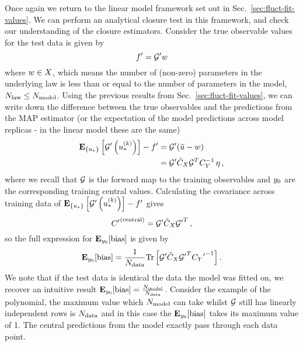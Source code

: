 Once again we return to the linear model framework set out in
Sec.~\ref{sec:fluct-fit-values}. We can perform an analytical closure test in
this framework, and check our understanding of the closure estimators. Consider
the true observable values for the test data is given by
\begin{equation}\label{eq:LinearLawMap}
    {{f}^{\prime}} = {{\mathcal{G}}^{\prime}} w
\end{equation}
where $w \in X$, which means the number of (non-zero)
parameters in the underlying law is less than or equal to the number of
parameters in the model, $N_{\rm law} \leq N_{\rm model}$. Using the previous results from
Sec.~\ref{sec:fluct-fit-values}, we can write down the difference between the
true observables and the predictions from the MAP estimator (or the expectation
of the model predictions across model replicas - in the linear model these are
the same)
\begin{equation}
    \begin{split}
        \mathbf{E}_{\{ u_* \}} \left[ {{\mathcal{G}}^{\prime}}\left(u_*^{(k)}\right) \right] - {{f}^{\prime}} &=
        {{\mathcal{G}}^{\prime}} (\tilde{u} - w ) \\
        &= {{\mathcal{G}}^{\prime}} \tilde{C}_X \mathcal{G}^T C_{Y}^{-1} \, \eta \, ,
    \end{split}
\end{equation}
where we recall that $\mathcal{G}$ is the forward map to the training observables
and $y_0$ are the corresponding training central values. Calculating
the covariance across training data of
$\mathbf{E}_{\{ u_* \}} \left[ {{\mathcal{G}}^{\prime}}\left(u_*^{(k)}\right) \right] - {{f}^{\prime}}$ gives
\begin{equation}
    {{C}^{\prime}}^{(\rm central)} = {{\mathcal{G}}^{\prime}} \tilde{C}_X {{\mathcal{G}}^{\prime}}^T \, ,
\end{equation}
so the full expression for $\mathbf{E}_{y_0}[{\rm bias}]$ is given by
\begin{equation}\label{eq:BiasLinearModel}
    \mathbf{E}_{y_0}[{\rm bias}] = \frac{1}{N_{\rm data}}
    {\rm Tr} \left[
        {{\mathcal{G}}^{\prime}} \tilde{C}_X {{\mathcal{G}}^{\prime}}^T
        {{C_{Y}}^{\prime}}^{-1}
    \right].
\end{equation}
We note that if the test data is identical the data the model was fitted on, we
recover an intuitive result $\mathbf{E}_{y_0}[{\rm bias}] =
\frac{N_{\rm model}}{N_{\rm data}}$. Consider the example of the polynomial, the maximum
value which $N_{\rm model}$ can take whilst $\mathcal{G}$ still has linearly independent
rows is $N_{\rm data}$ and in this case the $\mathbf{E}_{y_0}[{\rm bias}]$
takes its maximum value of 1. The central predictions from the model exactly
pass through each data point.

